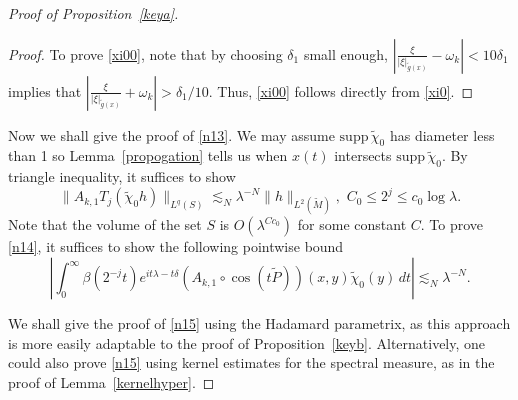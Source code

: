 \documentclass[10pt]{amsart}
\newcommand{\la}{\lambda}
\newcommand{\supp}{\mathrm{supp }}
\newcommand{\1}{{\bf 1}}
\begin{document}
\begin{proof}[Proof of Proposition~\ref{keya}]
\begin{proof}
To prove \eqref{xi00}, note that by choosing {$\delta_1$} small enough, {$\left|\frac{\xi}{|\xi|_{{\tilde{g}(x)}}}-\omega_k\right|<10\delta_1$ implies that $\left|\frac{\xi}{|\xi|_{{\tilde{g}(x)}}}+\omega_k\right|>\delta_1/10$}. Thus, \eqref{xi00} follows directly from \eqref{xi0}.
\end{proof}



Now we shall give the proof of \eqref{n13}.  We may assume $\supp\, \tilde{\chi}_0$ has diameter less than 1 so Lemma~\ref{propogation} tells us when $x(t)$  intersects $\supp \,\tilde{\chi}_0$.
 By triangle inequality, it suffices to show 
\begin{equation}\label{n14}
        \| A_{k,1}T_j(\tilde \chi_0 h)\|_{L^q(S)}\lesssim_N \la^{-N}\|h\|_{L^2(\tilde M)}, \, \, C_0\le 2^j\le c_0\log\la.
\end{equation}
Note that the volume of the set $S$ is $O(\la^{Cc_0})$ for some constant $C$. To prove \eqref{n14}, it suffices to show 
the following pointwise bound
\begin{equation}\label{n15}
\left|\int_0^\infty \beta(2^{-j}t)e^{it\la-t\delta}   ( A_{k,1}\circ \cos (t\tilde P))(x, y)\tilde \chi_0( y)\,dt \right|\lesssim_N \la^{-N}.
\end{equation}


We shall give the proof of \eqref{n15} using the Hadamard parametrix, as this approach is more easily adaptable to the proof of Proposition~\ref{keyb}. Alternatively, one could also prove \eqref{n15} using kernel estimates for the spectral measure, as in the proof of Lemma~\ref{kernelhyper}.





\end{proof}
\end{document}
